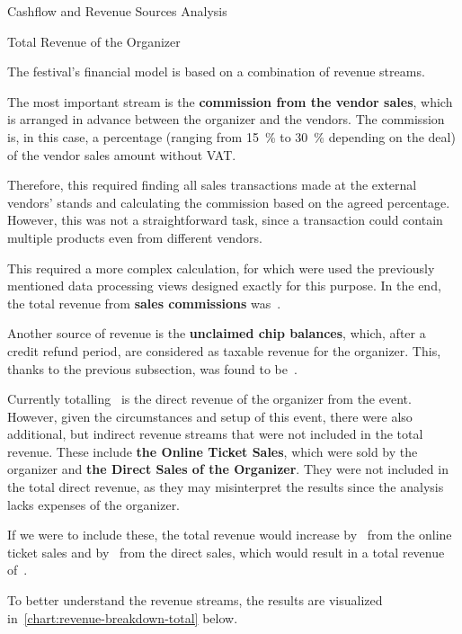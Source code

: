 \begin{section}{Cashflow and Revenue Sources Analysis}
	\pagebreak[4]

	\begin{subsection}{Total Revenue of the Organizer}
		\label{subsec:analysis-total-revenue}

		The festival's financial model is based on a combination of revenue streams.

		The most important stream is the \textbf{commission from the vendor sales}, which is arranged in advance between the organizer and the vendors.
		The commission is, in this case, a percentage (ranging from 15~\% to 30~\% depending on the deal) of the vendor sales amount without VAT\@.

		Therefore, this required finding all sales transactions made at the external vendors' stands and calculating the commission based on the agreed percentage.
		However, this was not a straightforward task, since a transaction could contain multiple products even from different vendors.

		This required a more complex calculation, for which were used the previously mentioned data processing views designed exactly for this purpose.
		In the end, the total revenue from \textbf{sales commissions} was~.

		Another source of revenue is the \textbf{unclaimed chip balances}, which, after a credit refund period, are considered as taxable revenue for the organizer.
		This, thanks to the previous subsection, was found to be~.

		Currently totalling~ is the direct revenue of the organizer from the event.
		However, given the circumstances and setup of this event, there were also additional, but indirect revenue streams that were not included in the total revenue.
		These include \textbf{the Online Ticket Sales}, which were sold by the organizer and \textbf{the Direct Sales of the Organizer}.
		They were not included in the total direct revenue, as they may misinterpret the results since the analysis lacks expenses of the organizer.

		If we were to include these, the total revenue would increase by~ from the online ticket sales and by~ from the direct sales, which would result in a total revenue of~.

		To better understand the revenue streams, the results are visualized in~\autoref{chart:revenue-breakdown-total} below.


\end{subsection}
\end{section}

